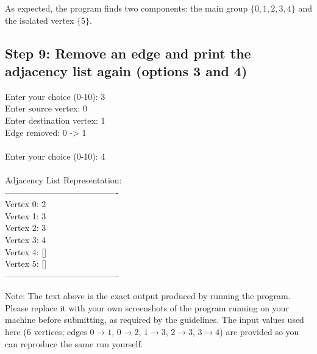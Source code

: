 \documentclass[11pt]{article}
\begin{document}
As expected, the program finds two components: the main group $\{0, 1, 2, 3, 4\}$ and the isolated vertex $\{5\}$.

\subsection*{Step 9: Remove an edge and print the adjacency list again (options 3 and 4)}
\begin{terminal}
Enter your choice (0-10): 3\\
Enter source vertex: 0\\
Enter destination vertex: 1\\
Edge removed: 0 -> 1\\
\ \\
Enter your choice (0-10): 4\\
\ \\
Adjacency List Representation:\\
----------------------------------------\\
Vertex 0: 2\\
Vertex 1: 3\\
Vertex 2: 3\\
Vertex 3: 4\\
Vertex 4: []\\
Vertex 5: []\\
----------------------------------------
\end{terminal}

\begin{notebox}
Note: The text above is the exact output produced by running the program. Please replace it with your own screenshots of the program running on your machine before submitting, as required by the guidelines. The input values used here (6 vertices; edges $0\to1$, $0\to2$, $1\to3$, $2\to3$, $3\to4$) are provided so you can reproduce the same run yourself.
\end{notebox}
\end{document}
